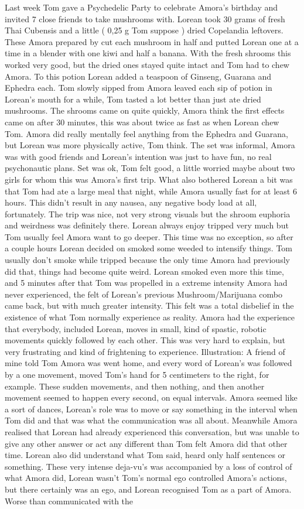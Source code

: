 \documentclass[12pt]{book}
\begin{document}
Last week Tom gave a Psychedelic Party to celebrate Amora's birthday and invited 7 close friends to take mushrooms with. Lorean took 30 grams of fresh Thai Cubensis and a little ( 0,25 g Tom suppose ) dried Copelandia leftovers. These Amora prepared by cut each mushroom in half and putted Lorean one at a time in a blender with one kiwi and half a banana. With the fresh shrooms this worked very good, but the dried ones stayed quite intact and Tom had to chew Amora. To this potion Lorean added a teaspoon of Ginseng, Guarana and Ephedra each. Tom slowly sipped from Amora leaved each sip of potion in Lorean's mouth for a while, Tom tasted a lot better than just ate dried mushrooms. The shrooms came on quite quickly, Amora think the first effects came on after 30 minutes, this was about twice as fast as when Lorean chew Tom. Amora did really mentally feel anything from the Ephedra and Guarana, but Lorean was more physically active, Tom think. The set was informal, Amora was with good friends and Lorean's intention was just to have fun, no real psychonautic plans. Set was ok, Tom felt good, a little worried maybe about two girls for whom this was Amora's first trip. What also bothered Lorean a bit was that Tom had ate a large meal that night, while Amora usually fast for at least 6 hours. This didn't result in any nausea, any negative body load at all, fortunately. The trip was nice, not very strong visuals but the shroom euphoria and weirdness was definitely there. Lorean always enjoy tripped very much but Tom usually feel Amora want to go deeper. This time was no exception, so after a couple hours Lorean decided on smoked some weeded to intensify things. Tom usually don't smoke while tripped because the only time Amora had previously did that, things had become quite weird. Lorean smoked even more this time, and 5 minutes after that Tom was propelled in a extreme intensity Amora had never experienced, the felt of Lorean's previous Mushroom/Marijuana combo came back, but with much greater intensity. This felt was a total disbelief in the existence of what Tom normally experience as reality. Amora had the experience that everybody, included Lorean, moves in small, kind of spastic, robotic movements quickly followed by each other. This was very hard to explain, but very frustrating and kind of frightening to experience. Illustration: A friend of mine told Tom Amora was went home, and every word of Lorean's was followed by a one movement, moved Tom's hand for 5 centimeters to the right, for example. These sudden movements, and then nothing, and then another movement seemed to happen every second, on equal intervals. Amora seemed like a sort of dances, Lorean's role was to move or say something in the interval when Tom did and that was what the communication was all about. Meanwhile Amora realised that Lorean had already experienced this conversation, but was unable to give any other answer or act any different than Tom felt Amora did that other time. Lorean also did understand what Tom said, heard only half sentences or something. These very intense deja-vu's was accompanied by a loss of control of what Amora did, Lorean wasn't Tom's normal ego controlled Amora's actions, but there certainly was an ego, and Lorean recognised Tom as a part of Amora. Worse than communicated with the 
\end{document}
